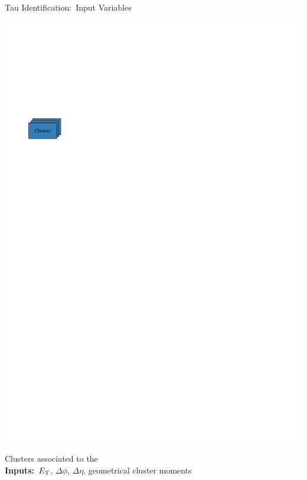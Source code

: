 \documentclass[11pt, xcolor={dvipsnames}, aspectratio=169, notes]{beamer}
\begin{document}
\begin{frame}{Tau Identification:\ Input Variables}
\begin{minipage}[c][2.2cm][c]{0.25\textwidth}
    \includegraphics[scale=1]{tauid/cluster_icon}
  \end{minipage}%
  \begin{minipage}[c][2.2cm][c]{0.75\textwidth}
    Clusters associated to the \tauhadvis\\[0.5\baselineskip]
    \textbf{Inputs:}\ $E_{\text{T}}$, $\Delta \phi$, $\Delta \eta$, geometrical cluster
    moments
  \end{minipage}
\end{frame}



\end{document}
